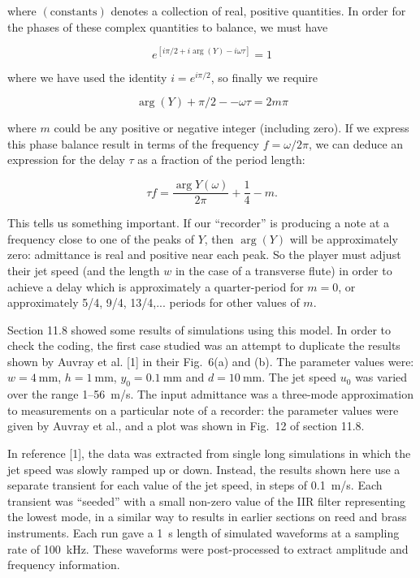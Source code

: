   where $(\mathrm{constants})$ denotes a collection of real, positive 
  quantities. In order for the phases of these complex quantities to balance, 
  we must have 

  $$e^{[i \pi/2 +i \arg(Y) -i \omega \tau]} = 1 \tag{19}$$ 

  where we have used the identity $i = e^{i \pi/2}$, so finally we require 

  $$\arg(Y) + \pi/2 -- \omega \tau = 2m \pi \tag{20}$$ 

  where $m$ could be any positive or negative integer (including zero). If we 
  express this phase balance result in terms of the frequency $f=\omega/2 \pi$, 
  we can deduce an expression for the delay $\tau$ as a fraction of the period 
  length: 

  $$\tau f= \dfrac{\arg Y(\omega)}{2 \pi} + \dfrac{1}{4} -m . \tag{21}$$ 

  This tells us something important. If our ``recorder'' is producing a note at 
  a frequency close to one of the peaks of $Y$, then $\arg (Y)$ will be 
  approximately zero: admittance is real and positive near each peak. So the 
  player must adjust their jet speed (and the length $w$ in the case of a 
  transverse flute) in order to achieve a delay which is approximately a 
  quarter-period for $m=0$, or approximately 5/4, 9/4, 13/4,... periods for 
  other values of $m$. 

  Section 11.8 showed some results of simulations using this model. In order to 
  check the coding, the first case studied was an attempt to duplicate the 
  results shown by Auvray et al. [1] in their Fig.\ 6(a) and (b). The parameter 
  values were: $w=4 \mathrm{~mm}$, $h=1 \mathrm{~mm}$, $y_0=0.1 \mathrm{~mm}$ 
  and $d=10 \mathrm{~mm}$. The jet speed $u_0$ was varied over the range 
  1--56~m/s. The input admittance was a three-mode approximation to 
  measurements on a particular note of a recorder: the parameter values were 
  given by Auvray et al., and a plot was shown in Fig.\ 12 of section 11.8. 

  In reference [1], the data was extracted from single long simulations in 
  which the jet speed was slowly ramped up or down. Instead, the results shown 
  here use a separate transient for each value of the jet speed, in steps of 
  0.1~m/s. Each transient was ``seeded'' with a small non-zero value of the IIR 
  filter representing the lowest mode, in a similar way to results in earlier 
  sections on reed and brass instruments. Each run gave a 1~s length of 
  simulated waveforms at a sampling rate of 100~kHz. These waveforms were 
  post-processed to extract amplitude and frequency information. 

